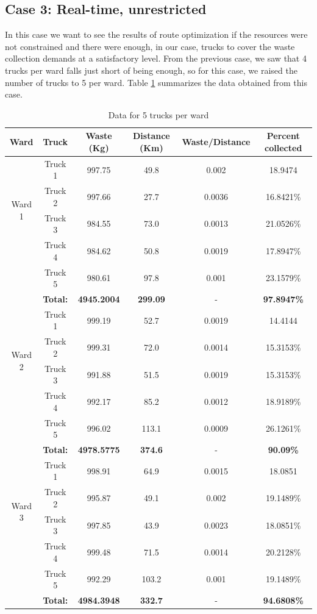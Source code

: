 \documentclass[12pt]{article}
\begin{document}
\subsection*{Case 3: Real-time, unrestricted}

In this case we want to see the results of route optimization if the resources were not constrained and there were enough, in our case, trucks to cover the waste collection demands at a satisfactory level. From the previous case, we saw that 4 trucks per ward falls just short of being enough, so for this case, we raised the number of trucks to 5 per ward. Table \ref{tab3} summarizes the data obtained from this case.

\begin{table}[H]
    \centering
    \caption{ Data for 5 trucks per ward} \label{tab3}
    \vspace*{0.3cm}
    \begin{tabular}{|c|c|c|c|c|c|}
        \hline Ward & Truck & Waste (Kg) & Distance (Km) & Waste/Distance & Percent collected \\
        \hline \multirow{4}{*}{Ward 1} & Truck 1 &997.75  &49.8  &0.002  &18.9474 \\
        \cline{2-6}& Truck 2 &997.66&27.7&0.0036&16.8421\%\\        
        \cline{2-6}& Truck 3 &984.55&73.0&0.0013&21.0526\%\\        
        \cline{2-6}& Truck 4 &984.62&50.8&0.0019&17.8947\%\\
        \cline{2-6}& Truck 5 &980.61&97.8&0.001&23.1579\%\\
        \hline &\textbf{Total:} &\textbf{4945.2004} &\textbf{299.09} &- &\textbf{97.8947\%}\\
        \hline \multirow{4}{*}{Ward 2} & Truck 1 &999.19  &52.7  &0.0019  &14.4144 \\
        \cline{2-6}& Truck 2 &999.31&72.0&0.0014&15.3153\%\\        
        \cline{2-6}& Truck 3 &991.88&51.5&0.0019&15.3153\%\\        
        \cline{2-6}& Truck 4 &992.17&85.2&0.0012&18.9189\%\\      
        \cline{2-6}& Truck 5 &996.02&113.1&0.0009&26.1261\%\\
        \hline &\textbf{Total:} &\textbf{4978.5775} &\textbf{374.6} &- &\textbf{90.09\%}\\     
        \hline \multirow{4}{*}{Ward 3} & Truck 1 &998.91  &64.9  &0.0015  &18.0851 \\
        \cline{2-6}& Truck 2 &995.87&49.1&0.002&19.1489\%\\        
        \cline{2-6}& Truck 3 &997.85&43.9&0.0023&18.0851\%\\        
        \cline{2-6}& Truck 4 &999.48&71.5&0.0014&20.2128\%\\
        \cline{2-6}& Truck 5 &992.29&103.2&0.001&19.1489\%\\
        \hline &\textbf{Total:} &\textbf{4984.3948} &\textbf{332.7}&- &\textbf{94.6808\%}\\
        \hline      
    \end{tabular}
\end{table}
\end{document}
